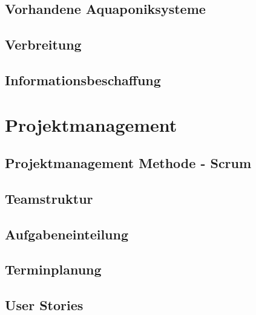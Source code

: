 \documentclass[12pt]{article}
\begin{document}
\subsection{Vorhandene Aquaponiksysteme}




\newpage 

\subsection{Verbreitung}

\newpage

\subsection{Informationsbeschaffung}
\label{sec:informationsbeschaffung}

\newpage


\newpage %
\section{Projektmanagement}
%

\subsection{Projektmanagement Methode - Scrum}


\subsection{Teamstruktur}


\newpage %
\subsection{Aufgabeneinteilung}

\newpage %
\subsection{Terminplanung}

\newpage

\subsection{User Stories}

\newpage
\end{document}
